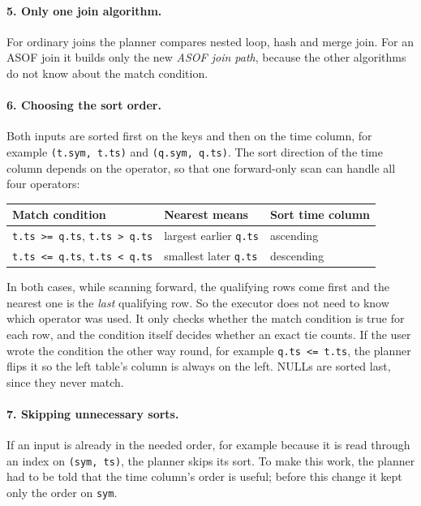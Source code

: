 \documentclass[11pt,a4paper]{article}
\newcommand{\code}[1]{\texttt{#1}}
\begin{document}
\paragraph{5. Only one join algorithm.}
For ordinary joins the planner compares nested loop, hash and merge join. For an ASOF
join it builds only the new \emph{ASOF join path}, because the other algorithms do not
know about the match condition.

\paragraph{6. Choosing the sort order.}
Both inputs are sorted first on the keys and then on the time column, for example
\code{(t.sym, t.ts)} and \code{(q.sym, q.ts)}. The sort direction of the time column
depends on the operator, so that one forward-only scan can handle all four operators:

\begin{center}
\begin{tabular}{@{}lll@{}}
\toprule
Match condition & Nearest means & Sort time column \\
\midrule
\code{t.ts >= q.ts}, \code{t.ts > q.ts} & largest earlier \code{q.ts} & ascending \\
\code{t.ts <= q.ts}, \code{t.ts < q.ts} & smallest later \code{q.ts} & descending \\
\bottomrule
\end{tabular}
\end{center}

In both cases, while scanning forward, the qualifying rows come first and the nearest one
is the \emph{last} qualifying row. So the executor does not need to know which operator
was used. It only checks whether the match condition is true for each row, and the
condition itself decides whether an exact tie counts. If the user wrote the condition the
other way round, for example \code{q.ts <= t.ts}, the planner flips it so the left
table's column is always on the left. NULLs are sorted last, since they never match.

\paragraph{7. Skipping unnecessary sorts.}
If an input is already in the needed order, for example because it is read through an
index on \code{(sym, ts)}, the planner skips its sort. To make this work, the planner had
to be told that the time column's order is useful; before this change it kept only the
order on \code{sym}.
\end{document}
